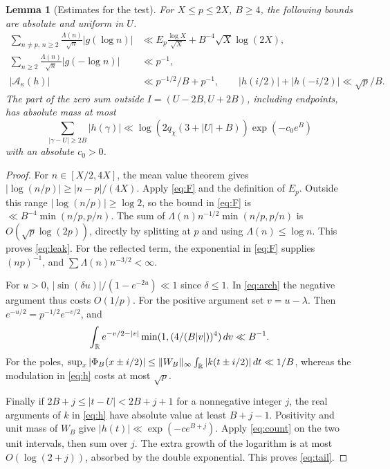 \documentclass[11pt]{article}
\newtheorem{lemma}[theorem]{Lemma}
\newcommand{\dd}{\,d}\newcommand{\supp}{\operatorname{supp}}
\begin{document}
\begin{lemma}[Estimates for the test]\label{lem:test}
For \(X\le p\le2X\), \(B\ge 4\), the following bounds are absolute and uniform in \(U\).
\begin{align}
 \sum_{n\ne p,\,n\ge2}\frac{\Lambda(n)}{\sqrt n}|g(\log n)|
 &\ll E_p\frac{\log X}{\sqrt X}+B^{-4}\sqrt X\log(2X),\label{eq:leak}\\
 \sum_{n\ge2}\frac{\Lambda(n)}{\sqrt n}|g(-\log n)|&\ll p^{-1},\label{eq:mirror}\\
 |\mathcal A_\kappa(h)|&\ll p^{-1/2}/B+p^{-1},\qquad
 |h(i/2)|+|h(-i/2)|\ll \sqrt p/B.\label{eq:other}
\end{align}
The part of the zero sum outside \(I=(U-2B,U+2B)\), including endpoints, has absolute mass at most
\begin{equation}\label{eq:tail}
 \sum_{|\gamma-U|\ge2B}|h(\gamma)|
 \ll \log(2q_\chi(3+|U|+B))\exp(-c_0 e^B)
\end{equation}
with an absolute \(c_0>0\).
\end{lemma}
\begin{proof}
For \(n\in[X/2,4X]\), the mean value theorem gives \(|\log(n/p)|\ge |n-p|/(4X)\). Apply \eqref{eq:F} and the definition of \(E_p\). Outside this range \(|\log(n/p)|\ge\log2\), so the bound in \eqref{eq:F} is \(\ll B^{-4}\min(n/p,p/n)\). The sum of \(\Lambda(n)n^{-1/2}\min(n/p,p/n)\) is \(O(\sqrt p\log(2p))\), directly by splitting at \(p\) and using \(\Lambda(n)\le\log n\). This proves \eqref{eq:leak}. For the reflected term, the exponential in \eqref{eq:F} supplies \((np)^{-1}\), and \(\sum\Lambda(n)n^{-3/2}<\infty\).

For \(u>0\), \(|\sin(\delta u)|/(1-e^{-2u})\ll1\) since \(\delta\le1\). In \eqref{eq:arch} the negative argument thus costs \(O(1/p)\). For the positive argument set \(v=u-\lambda\). Then \(e^{-u/2}=p^{-1/2}e^{-v/2}\), and
\[
 \int_{\R} e^{-v/2-|v|}\min(1,(4/(B|v|))^4)\dd v\ll B^{-1}.
\]
For the poles, \(\sup_x|\Phi_B(x\pm i/2)|\le \|W_B\|_\infty
\int_\R |k(t\pm i/2)|\dd t\ll1/B\), whereas the modulation in \eqref{eq:h} costs at most \(\sqrt p\).

Finally if \(2B+j\le |t-U|<2B+j+1\) for a nonnegative integer \(j\), the real arguments of \(k\) in \eqref{eq:h} have absolute value at least \(B+j-1\). Positivity and unit mass of \(W_B\) give \(|h(t)|\ll\exp(-c e^{B+j})\). Apply \eqref{eq:count} on the two unit intervals, then sum over \(j\). The extra growth of the logarithm is at most \(O(\log(2+j))\), absorbed by the double exponential. This proves \eqref{eq:tail}.
\end{proof}
\end{document}
